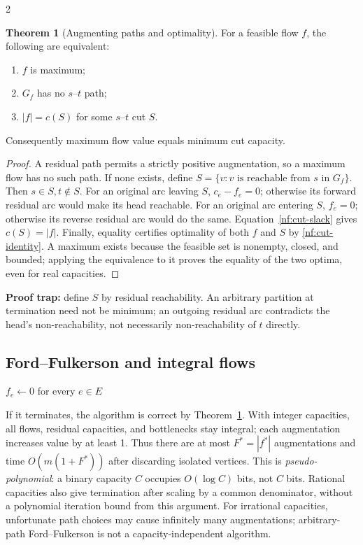 \documentclass[10pt]{article}
\theoremstyle{definition}
\newtheorem{theorem}[definition]{Theorem}
\begin{document}
\begin{multicols*}{2}
\begin{theorem}[Augmenting paths and optimality]\label{nf:mfmc}
For a feasible flow $f$, the following are equivalent:
\begin{enumerate}
 \item $f$ is maximum;
 \item $G_f$ has no $s$--$t$ path;
 \item $|f|=c(S)$ for some $s$--$t$ cut $S$.
\end{enumerate}
Consequently maximum flow value equals minimum cut capacity.
\end{theorem}
\begin{proof}
A residual path permits a strictly positive augmentation, so a maximum flow
has no such path. If none exists, define
$S=\{v:v\text{ is reachable from }s\text{ in }G_f\}$.
Then $s\in S,t\notin S$. For an original arc leaving $S$, $c_e-f_e=0$;
otherwise its forward residual arc would make its head reachable.
For an original arc entering $S$, $f_e=0$; otherwise its reverse residual arc
would do the same. Equation~\eqref{nf:cut-slack} gives $c(S)=|f|$.
Finally, equality certifies optimality of both $f$ and $S$ by
\eqref{nf:cut-identity}. A maximum exists because the feasible set is nonempty,
closed, and bounded; applying the equivalence to it proves the equality of
the two optima, even for real capacities.
\end{proof}
\textbf{Proof trap:} define $S$ by residual reachability. An arbitrary partition
at termination need not be minimum; an outgoing residual arc contradicts the
head's non-reachability, not necessarily non-reachability of $t$ directly.

\subsection{Ford--Fulkerson and integral flows}\label{nf:ff}

\begin{algorithm}[H]
\caption{Ford--Fulkerson: arbitrary residual augmenting paths}
$f_e\gets0$ for every $e\in E$\;
\;
\end{algorithm}
If it terminates, the algorithm is correct by Theorem~\ref{nf:mfmc}.
With integer capacities, all flows, residual capacities, and bottlenecks stay
integral; each augmentation increases value by at least 1. Thus there are at
most $F^*=|f^*|$ augmentations and time $O(m(1+F^*))$ after discarding isolated
vertices. This is \emph{pseudo-polynomial}: a binary capacity $C$ occupies
$O(\log C)$ bits, not $C$ bits. Rational capacities also give termination after
scaling by a common denominator, without a polynomial iteration bound from
this argument. For irrational capacities, unfortunate path choices may cause
infinitely many augmentations; arbitrary-path Ford--Fulkerson is not a
capacity-independent algorithm.


\end{multicols*}
\end{document}
